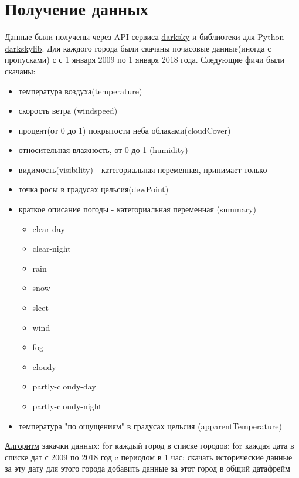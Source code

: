 \documentclass[11pt]{article}
\begin{document}
\section{Получение данных}
\label{sec:orgc57885d}
Данные были получены через API сервиса \href{https://darksky.net}{darksky} и библиотеки для Python \href{https://pypi.org/project/darkskylib/}{darkskylib}. Для каждого города были скачаны
почасовые данные(иногда с пропусками) с с 1 января 2009 по 1 января 2018 года. Следующие фичи были скачаны:
\begin{itemize}
\item температура воздуха(temperature)
\item скорость ветра (windspeed)
\item процент(от 0 до 1) покрытости неба облаками(cloudCover)
\item относительная влажность, от 0 до 1 (humidity)
\item видимость(visibility) - категориальная переменная, принимает только
\item точка росы в градусах цельсия(dewPoint)
\item краткое описание погоды - категориальная переменная (summary)
\begin{itemize}
\item clear-day
\item clear-night
\item rain
\item snow
\item sleet
\item wind
\item fog
\item cloudy
\item partly-cloudy-day
\item partly-cloudy-night
\end{itemize}
\item температура "по ощущениям" в градусах цельсия (apparentTemperature)
\end{itemize}

\href{https://github.com/gazon1/diplom/blob/master/main.py}{Алгоритм} закачки данных:
for каждый город в списке городов:
    for каждая дата в списке дат с 2009 по 2018 год c периодом в  1 час:
        скачать исторические данные за эту дату для этого города
    добавить данные за этот город в общий датафрейм
\end{document}
